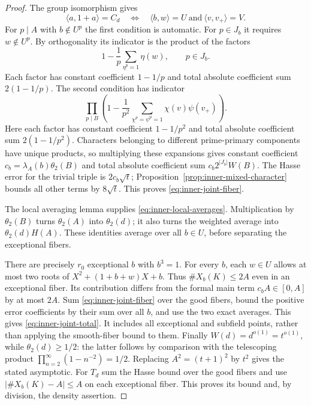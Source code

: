 \documentclass[11pt]{article}
\begin{document}
\begin{proof}
The group isomorphism gives
\[
 \langle a,1+a\rangle=C_d
 \quad\Longleftrightarrow\quad
 \langle b,w\rangle=U\ \text{and}\ \langle v,v_+\rangle=V.
\]
For $p\mid A$ with $b\notin U^p$ the first condition is automatic.
For $p\in J_b$ it requires $w\notin U^p$. By orthogonality its
indicator is the product of the factors
\[
 1-\frac1p\sum_{\eta^p=1}\eta(w),\qquad p\in J_b.
\]
Each factor has constant coefficient $1-1/p$ and total absolute
coefficient sum $2(1-1/p)$.
The second condition has indicator
\[
 \prod_{p\mid B}\left(1-\frac1{p^2}
        \sum_{\chi^p=\psi^p=1}\chi(v)\psi(v_+)\right).
\]
Here each factor has constant coefficient $1-1/p^2$ and total
absolute coefficient sum $2(1-1/p^2)$.
Characters belonging to different prime-primary components have
unique products, so multiplying these expansions gives constant
coefficient $c_b=\lambda_A(b)\theta_2(B)$ and total absolute
coefficient sum $c_b2^{|J_b|}W(B)$.
The Hasse error for the trivial triple is $2c_b\sqrt t$;
Proposition~\ref{prop:inner-mixed-character} bounds all other
terms by $8\sqrt t$. This proves \eqref{eq:inner-joint-fiber}.

The local averaging lemma supplies \eqref{eq:inner-local-averages}.
Multiplication by $\theta_2(B)$ turns $\theta_2(A)$ into
$\theta_2(d)$; it also turns the weighted average into
$\theta_2(d)H(A)$. These identities average over all $b\in U$,
before separating the exceptional fibers.

There are precisely $r_0$ exceptional $b$ with $b^3=1$.
For every $b$, each $w\in U$ allows at most two roots of
$X^2+(1+b+w)X+b$. Thus $\#X_b(K)\le2A$ even in an exceptional
fiber. Its contribution differs from the formal main term
$c_bA\in[0,A]$ by at most $2A$.
Sum \eqref{eq:inner-joint-fiber} over the good fibers, bound
the positive error coefficients by their sum over all $b$, and
use the two exact averages. This gives
\eqref{eq:inner-joint-total}. It includes all exceptional and
subfield points, rather than applying the smooth-fiber bound to them.
Finally $W(d)=d^{o(1)}=t^{o(1)}$, while $\theta_2(d)\ge1/2$:
the latter follows by comparison with the telescoping product
$\prod_{n=2}^\infty(1-n^{-2})=1/2$.
Replacing $A^2=(t+1)^2$ by $t^2$ gives the stated asymptotic.
For $T_d$ sum the Hasse bound over the good fibers and use
$|\#X_b(K)-A|\le A$ on each exceptional fiber.
This proves its bound and, by division, the density assertion.
\end{proof}
\end{document}
